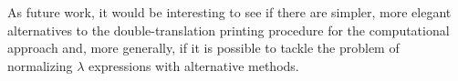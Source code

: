 \documentclass{article}
\begin{document}
As future work, it would be interesting to see if there are simpler, more elegant alternatives to the double-translation printing procedure for the computational approach and, more generally, if it is possible to tackle the problem of normalizing $\lambda$ expressions with alternative methods.

\clearpage
\end{document}
